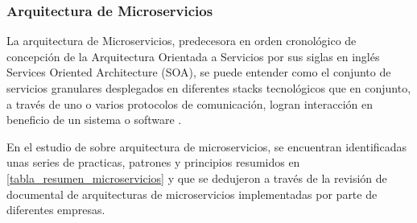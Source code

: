 \documentclass[stu,12pt,floatsintext]{apa7}
\begin{document}
	
	
	
	\subsubsection{Arquitectura de Microservicios}
	La arquitectura de Microservicios, predecesora en orden cronológico de concepción de la Arquitectura Orientada a Servicios por sus siglas en inglés Services Oriented Architecture (SOA), se puede entender como el conjunto de servicios granulares desplegados en diferentes stacks tecnológicos que en conjunto, a través de uno o varios protocolos de comunicación, logran interacción en beneficio de un sistema o software \cite{WASEEM2020110798}.
	
	En el estudio de \cite{10220070} sobre arquitectura de microservicios, se encuentran identificadas unas series de practicas, patrones y principios resumidos en \ref{tabla_resumen_microservicios} y que se dedujeron a través de la revisión de documental de arquitecturas de microservicios implementadas por parte de diferentes empresas.
	
\end{document}
